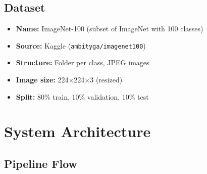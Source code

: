 \documentclass[11pt,a4paper]{article}
\begin{document}
\subsection{Dataset}
\begin{itemize}[noitemsep]
    \item \textbf{Name:} ImageNet-100 (subset of ImageNet with 100 classes)
    \item \textbf{Source:} Kaggle (\texttt{ambityga/imagenet100})
    \item \textbf{Structure:} Folder per class, JPEG images
    \item \textbf{Image size:} 224$\times$224$\times$3 (resized)
    \item \textbf{Split:} 80\% train, 10\% validation, 10\% test
\end{itemize}

\newpage


\section{System Architecture}

\subsection{Pipeline Flow}
\end{document}
